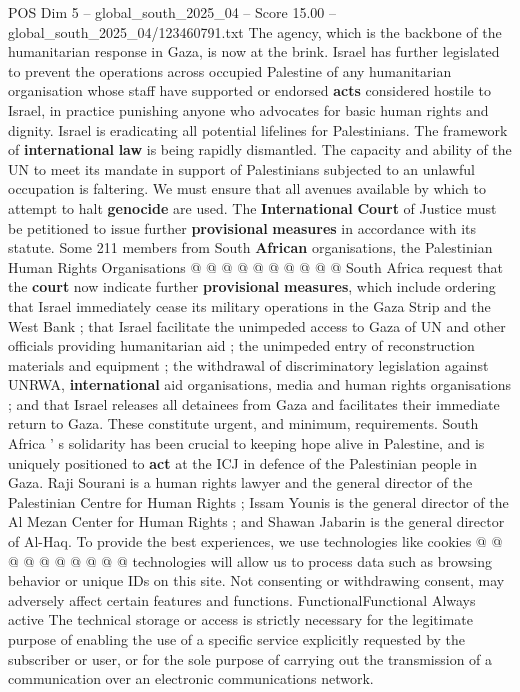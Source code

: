 \begin{textsample}{POS Dim 5 – global\_south\_2025\_04 – Score 15.00 – global\_south\_2025\_04/123460791.txt}
The agency, which is the backbone of the humanitarian response in Gaza, is now at the brink.
Israel has further legislated to prevent the operations across occupied Palestine of any humanitarian organisation whose staff have supported or endorsed \textbf{acts} considered hostile to Israel, in practice punishing anyone who advocates for basic human rights and dignity.
Israel is eradicating all potential lifelines for Palestinians.
The framework of \textbf{international} \textbf{law} is being rapidly dismantled.
The capacity and ability of the UN to meet its mandate in support of Palestinians subjected to an unlawful occupation is faltering.
We must ensure that all avenues available by which to attempt to halt \textbf{genocide} are used.
The \textbf{International} \textbf{Court} of Justice must be petitioned to issue further \textbf{provisional} \textbf{measures} in accordance with its statute.
Some 211 members from South \textbf{African} organisations, the Palestinian Human Rights Organisations @ @ @ @ @ @ @ @ @ @ South Africa request that the \textbf{court} now indicate further \textbf{provisional} \textbf{measures}, which include ordering that Israel immediately cease its military operations in the Gaza Strip and the West Bank ; that Israel facilitate the unimpeded access to Gaza of UN and other officials providing humanitarian aid ; the unimpeded entry of reconstruction materials and equipment ; the withdrawal of discriminatory legislation against UNRWA, \textbf{international} aid organisations, media and human rights organisations ; and that Israel releases all detainees from Gaza and facilitates their immediate return to Gaza.
These constitute urgent, and minimum, requirements.
South Africa ' s solidarity has been crucial to keeping hope alive in Palestine, and is uniquely positioned to \textbf{act} at the ICJ in defence of the Palestinian people in Gaza.
Raji Sourani is a human rights lawyer and the general director of the Palestinian Centre for Human Rights ; Issam Younis is the general director of the Al Mezan Center for Human Rights ; and Shawan Jabarin is the general director of Al-Haq.
To provide the best experiences, we use technologies like cookies @ @ @ @ @ @ @ @ @ @ technologies will allow us to process data such as browsing behavior or unique IDs on this site.
Not consenting or withdrawing consent, may adversely affect certain features and functions.
FunctionalFunctional Always active The technical storage or access is strictly necessary for the legitimate purpose of enabling the use of a specific service explicitly requested by the subscriber or user, or for the sole purpose of carrying out the transmission of a communication over an electronic communications network.

\end{textsample}
